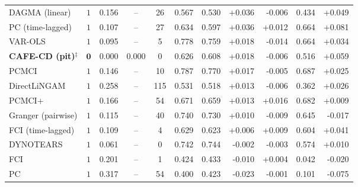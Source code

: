 \begin{table}[tbp]
\begin{tabular}{@{}lccccrrrrrr@{}}
DAGMA (linear) & $1$ & 0.156 & -- & 26 & 0.567 & 0.530 & +0.036 & -0.006 & 0.434 & +0.049 \\
PC (time-lagged) & $1$ & 0.107 & -- & 27 & 0.634 & 0.597 & +0.036 & +0.012 & 0.664 & +0.081 \\
VAR-OLS & $1$ & 0.095 & -- & 5 & 0.778 & 0.759 & +0.018 & -0.014 & 0.664 & +0.034 \\
\textbf{CAFE-CD (pit)}$^{\ddagger}$ & $\mathbf{0}$ & 0.000 & 0.000 & 0 & 0.626 & 0.608 & +0.018 & -0.006 & 0.516 & +0.059 \\
PCMCI & $1$ & 0.146 & -- & 10 & 0.787 & 0.770 & +0.017 & -0.005 & 0.687 & +0.025 \\
DirectLiNGAM & $1$ & 0.258 & -- & 115 & 0.531 & 0.518 & +0.013 & -0.006 & 0.362 & +0.026 \\
PCMCI+ & $1$ & 0.166 & -- & 54 & 0.671 & 0.659 & +0.013 & +0.016 & 0.682 & +0.009 \\
Granger (pairwise) & $1$ & 0.115 & -- & 40 & 0.740 & 0.730 & +0.010 & -0.009 & 0.645 & -0.017 \\
FCI (time-lagged) & $1$ & 0.109 & -- & 4 & 0.629 & 0.623 & +0.006 & +0.009 & 0.604 & +0.041 \\
DYNOTEARS & $1$ & 0.061 & -- & 0 & 0.742 & 0.744 & -0.002 & -0.003 & 0.574 & +0.010 \\
FCI & $1$ & 0.201 & -- & 1 & 0.424 & 0.433 & -0.010 & +0.004 & 0.042 & -0.020 \\
PC & $1$ & 0.317 & -- & 54 & 0.400 & 0.423 & -0.023 & -0.001 & 0.101 & -0.075 \\
\bottomrule
\end{tabular}
\end{table}
